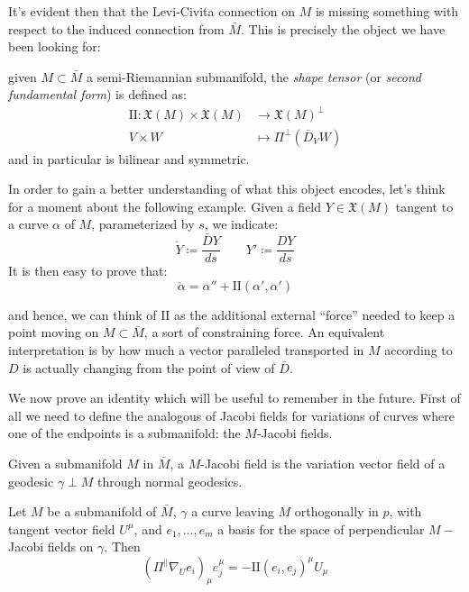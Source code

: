 It's evident then that the Levi-Civita connection on \(M\) is missing something with respect to the induced connection from \(\bar{M}\). This is precisely the object we have been looking for:

\begin{definition}
	given \(M \subset \bar{M}\) a semi-Riemannian submanifold, the \emph{shape tensor} (or \emph{second fundamental form}) is defined as:
	\begin{align*}
		\mathrm{I\!I} : \mathfrak{X}(M) \times \mathfrak{X}(M) &\longrightarrow \mathfrak{X}(M)^{\perp}\\
							V \times W &\mapsto \Pi^{\perp}\left(\bar{D}_V W\right)
	\end{align*}
	\noindent and in particular is bilinear and symmetric.
\end{definition}

In order to gain a better understanding of what this object encodes, let's think for a moment about the following example. Given a field \(Y \in \mathfrak{X}(M)\) tangent to a curve \(\alpha\) of \(M\), parameterized by \(s\), we indicate:
\[
\dot{Y} \coloneqq \frac{\bar{D}Y}{ds} \quad \quad Y' \coloneqq \frac{DY}{ds}
\]
It is then easy to prove that:
\[
\ddot{\alpha} = \alpha'' + \mathrm{I\!I}(\alpha', \alpha')
\]

and hence, we can think of \(\mathrm{I\!I}\) as the additional external ``force'' needed to keep a point moving on \(M \subset \bar{M}\), a sort of constraining force. An equivalent interpretation is by how much a vector paralleled transported in \(M\) according to \(D\) is actually changing from the point of view of \(\bar{D}\).


We now prove an identity which will be useful to remember in the future. First of all we need to define the analogous of Jacobi fields for variations of curves where one of the endpoints is a submanifold: the \(M\)-Jacobi fields.
\begin{definition}
	Given a submanifold \(M\) in \(\bar{M}\), a \(M\)-Jacobi field is the variation vector field of a geodesic \(\gamma \perp M\) through normal geodesics.
\end{definition}
\begin{lemma}
	\label{lemma:shape-identity}
	Let \(M\) be a submanifold of \(\bar{M}\), \(\gamma\) a curve leaving \(M\) orthogonally in \(p\), with tangent vector field \(U^{\mu}\), and \(e_1, \ldots, e_m\) a basis for the space of perpendicular \(M-\)Jacobi fields on \(\gamma\).
	Then 
	\begin{equation}
		(\Pi^{\parallel}\nabla_Ue_i)_{\mu}e_j^{\mu} = - \mathrm{I\!I}(e_i, e_j)^{\mu}U_{\mu}
	\end{equation}
\end{lemma}

